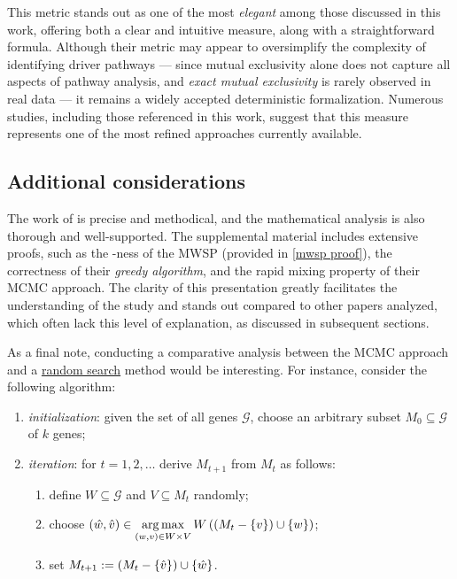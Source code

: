 This metric stands out as one of the most \textit{elegant} among those discussed in this work, offering both a clear and intuitive measure, along with a straightforward formula. Although their metric may appear to oversimplify the complexity of identifying driver pathways --- since mutual exclusivity alone does not capture all aspects of pathway analysis, and \textit{exact mutual exclusivity} is rarely observed in real data --- it remains a widely accepted deterministic formalization. Numerous studies, including those referenced in this work, suggest that this measure represents one of the most refined approaches currently available.

\subsection{Additional considerations}

The work of \textcite{dendrix} is precise and methodical, and the mathematical analysis is also thorough and well-supported. The supplemental material includes extensive proofs, such as the \NPHard-ness of the MWSP (provided in \cref{mwsp proof}), the correctness of their \textit{greedy algorithm}, and the rapid mixing property of their MCMC approach. The clarity of this presentation greatly facilitates the understanding of the study and stands out compared to other papers analyzed, which often lack this level of explanation, as discussed in subsequent sections.

As a final note, conducting a comparative analysis between the MCMC approach and a \href{https://en.wikipedia.org/wiki/Random_search}{random search} method would be interesting. For instance, consider the following algorithm:

\begin{enumerate}
    \item \textit{initialization}: given the set of all genes $\mathcal G$, choose an arbitrary subset $M_0 \subseteq \mathcal G$ of $k$ genes;
    \item \textit{iteration}: for $t = 1, 2, \ldots$ derive $M_{t + 1}$ from $M_t$ as follows:

    \begin{enumerate}
        \item define $W \subseteq \mathcal G$ and $V \subseteq M_t$ randomly;
        \item choose $\displaystyle (\hat w, \hat v) \in \operatorname*{arg\,max}_{(w, v) \in W \times V}{W\left(\left(M_t - \{v\}\right) \cup \{w\}\right)}$;
        \item set $M_{t + 1} := \left(M_t - \{\hat v\}\right) \cup \{\hat w\}$.
    \end{enumerate}
\end{enumerate}

